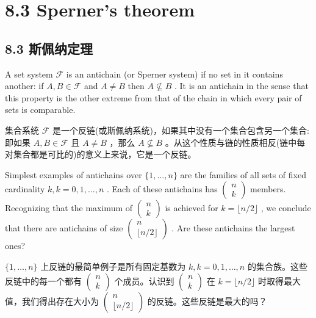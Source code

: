 \documentclass[10pt]{article}
\begin{document}
\section*{8.3 Sperner's theorem}

\begin{tcolorbox}\relax
\section*{8.3 斯佩纳定理}
\end{tcolorbox}

A set system \(\mathcal{F}\) is an antichain (or Sperner system) if no set in it contains another: if \(A,B \in  \mathcal{F}\) and \(A \neq  B\) then \(A \nsubseteq  B\) . It is an antichain in the sense that this property is the other extreme from that of the chain in which every pair of sets is comparable.

\begin{tcolorbox}\relax
集合系统 \(\mathcal{F}\) 是一个反链(或斯佩纳系统)，如果其中没有一个集合包含另一个集合:即如果 \(A,B \in  \mathcal{F}\) 且 \(A \neq  B\) ，那么 \(A \nsubseteq  B\) 。从这个性质与链的性质相反(链中每对集合都是可比的)的意义上来说，它是一个反链。
\end{tcolorbox}

Simplest examples of antichains over \(\{ 1,\ldots ,n\}\) are the families of all sets of fixed cardinality \(k,k = 0,1,\ldots ,n\) . Each of these antichains has \(\left( \begin{array}{l} n \\  k \end{array}\right)\) members. Recognizing that the maximum of \(\left( \begin{array}{l} n \\  k \end{array}\right)\) is achieved for \(k = \lfloor n/2\rfloor\) , we conclude that there are antichains of size \(\left( \begin{matrix} n \\  \lfloor n/2\rfloor  \end{matrix}\right)\) . Are these antichains the largest ones?

\begin{tcolorbox}\relax
\(\{ 1,\ldots ,n\}\) 上反链的最简单例子是所有固定基数为 \(k,k = 0,1,\ldots ,n\) 的集合族。这些反链中的每一个都有 \(\left( \begin{array}{l} n \\  k \end{array}\right)\) 个成员。认识到 \(\left( \begin{array}{l} n \\  k \end{array}\right)\) 在 \(k = \lfloor n/2\rfloor\) 时取得最大值，我们得出存在大小为 \(\left( \begin{matrix} n \\  \lfloor n/2\rfloor  \end{matrix}\right)\) 的反链。这些反链是最大的吗？
\end{tcolorbox}
\end{document}
